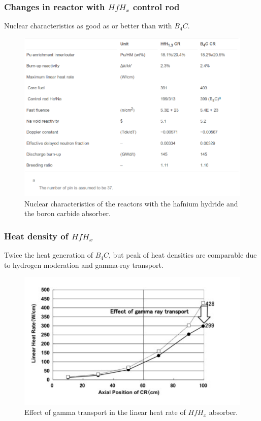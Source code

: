 \documentclass[9pt]{beamer}
\newcommand{\hfh}{$HfH_{x}$\xspace}
\newcommand{\bc}{$B_4C$\xspace}
\begin{document}
\begin{frame}
\frametitle{Changes in reactor with \hfh control rod}
Nuclear characteristics as good as or better than with \bc.
\begin{figure}[htbp!]
  \begin{center}
      \includegraphics[scale=0.25]{./images/reac.png}
  \end{center}
  \caption{Nuclear characteristics of the reactors with the hafnium hydride and the boron carbide absorber.}
  \label{fig:reac}
\end{figure}
\end{frame}

\begin{frame}
\frametitle{Heat density of \hfh}
Twice the heat generation of \bc, but peak of heat densities are comparable
due to hydrogen moderation and gamma-ray transport.
\begin{figure}[htbp!]
  \begin{center}
      \includegraphics[scale=0.3]{./images/gamma.png}
  \end{center}
  \caption{Effect of gamma transport in the linear heat rate of \hfh absorber.}
  \label{fig:reac}
\end{figure}
\end{frame}
\end{document}
